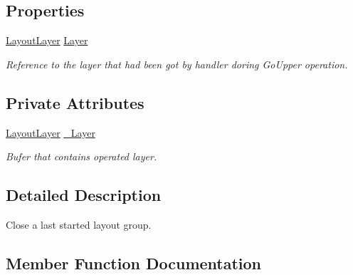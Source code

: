 \subsection*{Properties}
\begin{DoxyCompactItemize}
\item 
\mbox{\hyperlink{class_wpf_handler_1_1_u_i_1_1_auto_layout_1_1_layout_layer}{Layout\+Layer}} \mbox{\hyperlink{class_wpf_handler_1_1_u_i_1_1_auto_layout_1_1_configuration_1_1_end_group_attribute_aa49aeed9019ee998b6b85920251ce7c2}{Layer}}
\begin{DoxyCompactList}\small\item\em Reference to the layer that had been got by handler doring Go\+Upper operation. \end{DoxyCompactList}\end{DoxyCompactItemize}
\subsection*{Private Attributes}
\begin{DoxyCompactItemize}
\item 
\mbox{\hyperlink{class_wpf_handler_1_1_u_i_1_1_auto_layout_1_1_layout_layer}{Layout\+Layer}} \mbox{\hyperlink{class_wpf_handler_1_1_u_i_1_1_auto_layout_1_1_configuration_1_1_end_group_attribute_a8f6eb211c88e7d5ade018a8f79d34a17}{\+\_\+\+Layer}}
\begin{DoxyCompactList}\small\item\em Bufer that contains operated layer. \end{DoxyCompactList}\end{DoxyCompactItemize}


\subsection{Detailed Description}
Close a last started layout group. 



\subsection{Member Function Documentation}
\mbox{\label{class_wpf_handler_1_1_u_i_1_1_auto_layout_1_1_configuration_1_1_end_group_attribute_acaed685d0daf2b14d8f232389d56c478}} 
